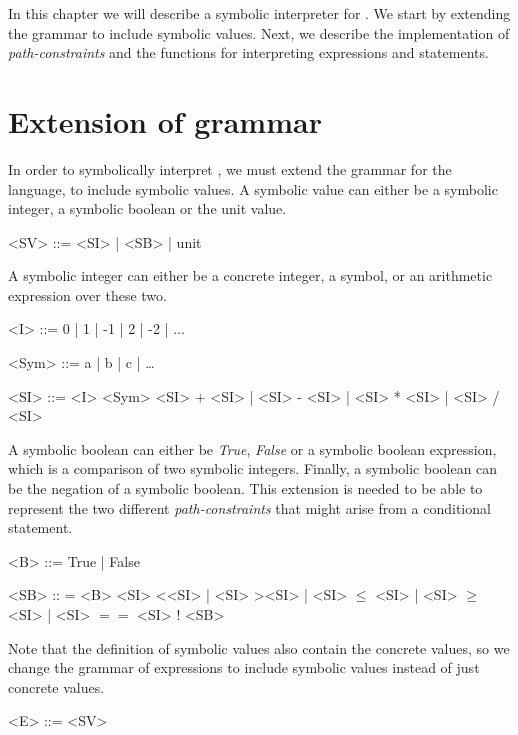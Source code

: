 In this chapter we will describe a symbolic interpreter for \explanguage. We start by extending the grammar to include symbolic values. Next, we describe the implementation of \emph{path-constraints} and the functions for interpreting expressions and statements.

\section{Extension of grammar}

In order to symbolically interpret \explanguage, we must extend the grammar for the language, to include symbolic values. A symbolic value can either be a symbolic integer, a symbolic boolean or the unit value. 

\begin{grammar}
	<SV> ::= <SI> | <SB> | unit
\end{grammar}

A symbolic integer can either be a concrete integer, a symbol, or an arithmetic expression over these two.

\begin{grammar}
	<I> ::= 0 | 1 | -1 | 2 | -2 | $\ldots$
	
	<Sym> ::= a | b | c | \ldots
	
	<SI> ::= <I>
	\alt <Sym>	
	\alt <SI> + <SI> | <SI> - <SI> | <SI> * <SI> | <SI> / <SI>  
\end{grammar}

A symbolic boolean can either be \textsl{True}, \textsl{False} or a symbolic boolean expression, which is a comparison of two symbolic integers. Finally, a symbolic boolean can be the negation of a symbolic boolean. This extension is needed to be able to represent the two different \emph{path-constraints} that might arise from a conditional statement.

\begin{grammar}
	<B> ::= True | False 
	
	<SB> :: = <B>
	\alt <SI> \textless <SI> | <SI> \textgreater <SI> | <SI> $\leq$ <SI> | <SI> $\geq$ <SI> | <SI> $==$ <SI>
	\alt ! <SB>
\end{grammar} 

Note that the definition of symbolic values also contain the concrete values, so we change the grammar of expressions to include symbolic values instead of just concrete values.

\begin{grammar}
	<E> ::= <SV>
\end{grammar}

